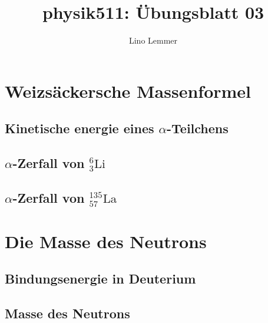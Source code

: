 

\renewcommand\thesection{Übung \arabic{section}}
\renewcommand\thesubsection{\arabic{section}\alph{subsection}}

\title{physik511: Übungsblatt 03}
\author{Lino Lemmer}


\maketitle
\section{Weizsäckersche Massenformel}
\subsection{Kinetische energie eines $\alpha$-Teilchens}
\subsection{$\alpha$-Zerfall von $_3^6\text{Li}$}
\subsection{$\alpha$-Zerfall von $_{57}^{135}\text{La}$}

\section{Die Masse des Neutrons}
\subsection{Bindungsenergie in Deuterium}
\subsection{Masse des Neutrons}


